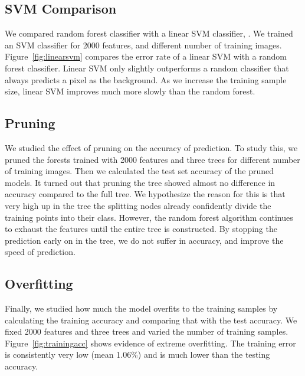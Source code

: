 \cutsubsection
\subsection{ SVM Comparison}
\cutsubsection
We compared random forest classifier with a linear SVM classifier, \cite{liblinear}. We trained an SVM classifier for 2000 features, and different number of training images. 
Figure~\ref{fig:linearsvm} compares the error rate of a linear SVM with a random forest classifier. Linear SVM only slightly outperforms a random classifier that always predicts a pixel as the background. As we increase the training sample size, linear SVM improves much more slowly than the random forest.

\cutsubsection
\subsection{Pruning}
\cutsubsection
We studied the effect of pruning on the accuracy of prediction. To study this, we pruned the forests trained with 2000 features and three trees for different number of training images. Then we calculated the test set accuracy of the pruned models. It turned out that pruning the tree showed almost no difference in accuracy compared to the full tree. We hypothesize the reason for this is that very high up in the tree the splitting nodes already confidently divide the training points into their class. However, the random forest algorithm continues to exhaust the features until the entire tree is constructed. By stopping the prediction early on in the tree, we do not suffer in accuracy, and improve the speed of prediction.

\cutsubsection
\subsection{Overfitting}
\cutsubsection
Finally, we studied how much the model overfits to the training samples by calculating the training accuracy and comparing that with the test accuracy. We fixed 2000 features and three trees and varied the number of training samples. Figure~\ref{fig:trainingacc} shows evidence of extreme overfitting. The training error is consistently very low (mean 1.06\%) and is much lower than the testing accuracy. 

